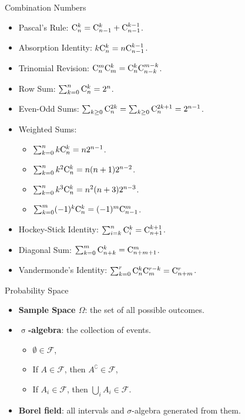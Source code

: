 \documentclass[landscape,a4paper]{article}
\begin{document}
	
	\begin{cheatsheetcolumns}
		\begin{card}{Combination Numbers}
			\begin{itemize}
				\item Pascal's Rule: $\mathrm{C}_{n}^{k}=\mathrm{C}_{n-1}^{k}+\mathrm{C}_{n-1}^{k-1}$.
				\item Absorption Identity: $k\mathrm{C}_{n}^{k}=n\mathrm{C}_{n-1}^{k-1}$.
				\item Trinomial Revision: $\mathrm{C}_{n}^{m}\mathrm{C}_{m}^{k}=\mathrm{C}_{n}^{k}\mathrm{C}_{n-k}^{m-k}$.
				\item Row Sum: $\sum_{k=0}^{n}\mathrm{C}_{n}^{k}=2^n$.
				\item Even-Odd Sums: $\sum_{k\ge 0} \mathrm{C}_{n}^{2k}=\sum_{k\ge 0}\mathrm{C}_{n}^{2k+1}=2^{n-1}$.
				\item Weighted Sums:
				\begin{itemize} 
					\item $\sum_{k=0}^{n}k\mathrm{C}_{n}^{k}=n2^{n-1}$.
				\item $\sum_{k=0}^{n}k^2\mathrm{C}_{n}^{k}=n(n+1)2^{n-2}$.
				\item  $\sum_{k=0}^{n}k^3\mathrm{C}_{n}^{k}=n^2(n+3)2^{n-3}$.
				\item  $\sum_{k=0}^m(-1)^k\mathrm{C}_{n}^{k}=(-1)^m\mathrm{C}_{n-1}^{m}$.
				\end{itemize}
				\item Hockey-Stick Identity: $\sum_{i=k}^n\mathrm{C}_{i}^{k}=\mathrm{C}_{n+1}^{k+1}$.
				\item Diagonal Sum: $\sum_{k=0}^m \mathrm{C}_{n+k}^{k}=\mathrm{C}_{n+m+1}^{m}$.
				\item Vandermonde's Identity: $\sum_{k=0}^r \mathrm{C}_{n}^{k}\mathrm{C}_{m}^{r-k}=\mathrm{C}_{n+m}^{r}$.
			\end{itemize}
		\end{card}
		\begin{card}{Probability Space}
			\begin{itemize}
				\item \textbf{Sample Space $\Omega$}: the set of all possible outcomes.
				\item \textbf{$\upsigma$-algebra}: the collection of events.
				\begin{itemize}
					\item $\emptyset\in\mathcal F$,
					\item If $A\in\mathcal F$, then $A^\complement\in \mathcal F$,
					\item If $A_i\in\mathcal F$, then $\bigcup_i A_i\in\mathcal F$.
				\end{itemize}
				\item \textbf{Borel field}: all intervals and $\sigma$-algebra generated from them.

\end{itemize}
\end{card}
\end{cheatsheetcolumns}
\end{document}
